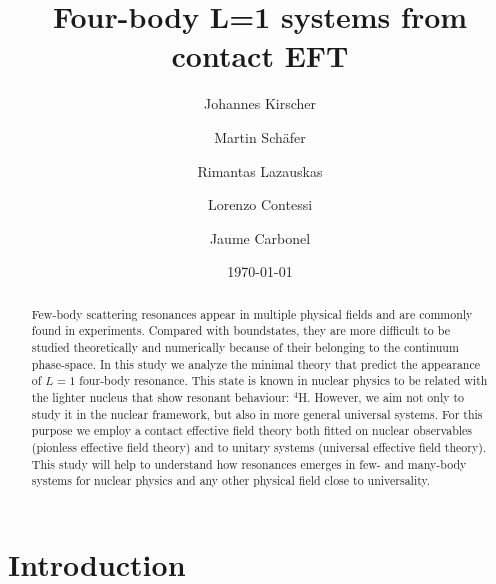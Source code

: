 \documentclass[aps,onecolumn,preprintnumbers,amsmath,amssymb,nofootinbib,superscriptaddress,notitlepage]{revtex4-1}
\begin{document}
\title{Four-body L=1 systems from contact EFT}

\author{Johannes Kirscher}
\address{Theoretical Physics Division, School of Physics and Astronomy,\\
  The University of Manchester, Manchester, M13 9PL, UK}
  
\author{Martin Sch{\"a}fer}
\address{Nuclear Physics Institute of the Czech Academy of Sciences, 25069 \v{R}e\v{z}, Czech Republic}
  
\author{Rimantas Lazauskas}
\address{IPHC, IN2P3-CNRS/Universit\'e de Strasbourg BP 28, F-67037 Strasbourg Cedex 2, France}

\author{Lorenzo Contessi}
\address{IRFU, CEA, Universit\'e Paris-Saclay, 91191 Gif-sur-Yvette, France}

\author{Jaume Carbonel}
\address{Universit\'e Paris-Saclay, CNRS/IN2P3, IJCLab, 91405 Orsay, France} 

\date{\today}




\begin{abstract} 
Few-body scattering resonances appear in multiple physical fields and are commonly found in experiments. 
Compared with boundstates, they are more difficult to be studied theoretically and numerically because of their belonging to the continuum phase-space.
In this study we analyze the minimal theory that predict the appearance of $L=1$ four-body resonance.
This state is known in nuclear physics to be related with the lighter nucleus that show resonant behaviour: $^4$H.
However, we aim not only to study it in the nuclear framework, but also in more general universal systems.
For this purpose we employ a contact effective field theory both fitted on nuclear observables (pionless effective field theory) and to unitary systems (universal effective field theory).
This study will help to understand how resonances emerges in few- and many-body systems for nuclear physics and any other physical field close to universality.
\end{abstract}



\maketitle

\section{Introduction}
\end{document}
